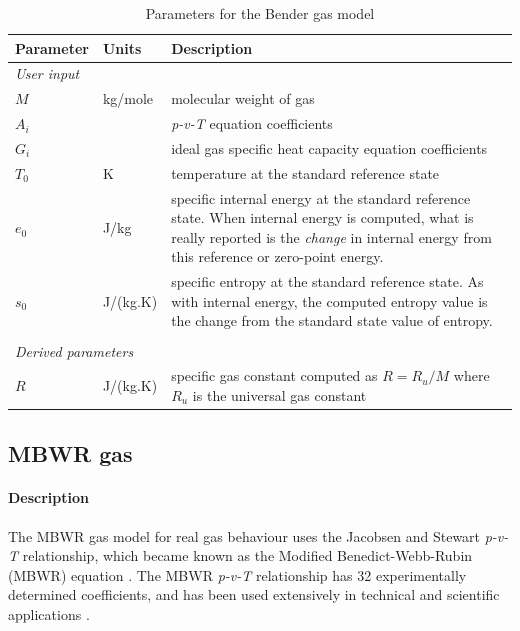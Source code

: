 \begin{table}[h]
\caption{Parameters for the Bender gas model}
\label{tab:bender-params}
\begin{tabular}{llp{10cm}}
\toprule
Parameter & Units & Description \\ \midrule
\multicolumn{3}{l}{\textit{User input}} \\
$M$       & kg/mole & molecular weight of gas \\
$A_i$     &       & \textit{p-v-T} equation coefficients \\
$G_i$     &       & ideal gas specific heat capacity equation coefficients \\
$T_0$     & K     & temperature at the standard reference state \\
$e_0$     & J/kg   & specific internal energy at the standard reference state.
                    When internal energy is computed, what is really 
                    reported is the \emph{change} in internal energy
                    from this reference or zero-point energy. \\
$s_0$     & J/(kg.K) & specific entropy at the standard reference state.
                       As with internal energy, the computed entropy value
                       is the change from the standard state value of entropy. \\
 & & \\
\multicolumn{3}{l}{\textit{Derived parameters}} \\
$R$      & J/(kg.K) & specific gas constant computed as $R = R_u/M$ where
                      $R_u$ is the universal gas constant \\
\bottomrule
\end{tabular}
\end{table}

\subsection{MBWR gas}
\label{sec:MBWR_gas}

\paragraph{Description}
The MBWR gas model for real gas behaviour uses the Jacobsen and Stewart
\cite{jacobsen1973thermodynamic} \textit{p-v-T} relationship, which became known
as the Modified Benedict-Webb-Rubin (MBWR) equation \cite{span2000multiparameter}.
The MBWR \textit{p-v-T} relationship has 32 experimentally determined coefficients,
and has been used extensively in technical and scientific applications \cite{sengers2000equations}.

